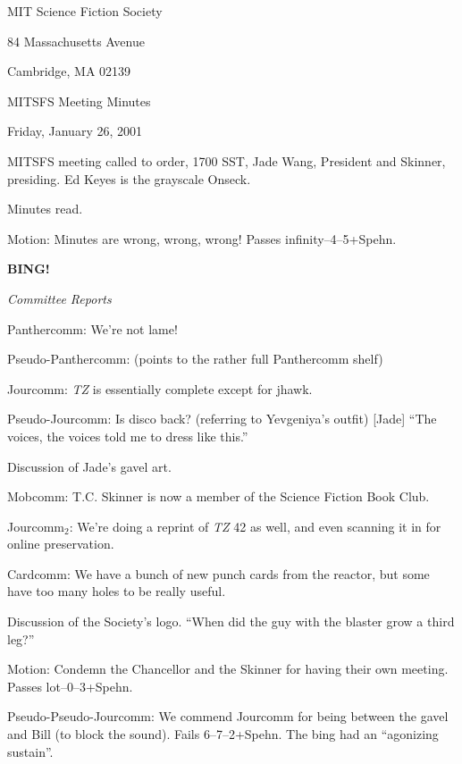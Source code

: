 \documentclass[12pt]{article}
\newcommand{\bing}{{\bf BING!} }
\newcommand{\goto}[1]{\bing \vskip 12pt \centerline{{\em{#1}}}}
\begin{document}
\begin{center}

MIT Science Fiction Society 

84 Massachusetts Avenue

Cambridge, MA 02139

\vspace{12pt}

MITSFS Meeting Minutes 

Friday, January 26, 2001

\end{center}
 
\vspace{18pt}

\setlength{\parskip}{6pt}

\noindent
MITSFS meeting called to order, 1700 SST, Jade Wang, President and
Skinner, presiding.  Ed Keyes is the grayscale Onseck.

Minutes read.

Motion: Minutes are wrong, wrong, wrong!  Passes infinity--4--5+Spehn.

\goto{Committee Reports}

Panthercomm: We're not lame!

Pseudo-Panthercomm: (points to the rather full Panthercomm shelf)

Jourcomm: {\em TZ} is essentially complete except for jhawk.

Pseudo-Jourcomm: Is disco back?  (referring to Yevgeniya's outfit)
[Jade] ``The voices, the voices told me to dress like this.''

Discussion of Jade's gavel art.

Mobcomm: T.C. Skinner is now a member of the Science Fiction Book Club.

Jourcomm$_2$: We're doing a reprint of {\em TZ} 42 as well, and even
scanning it in for online preservation.

Cardcomm: We have a bunch of new punch cards from the reactor, but
some have too many holes to be really useful.

Discussion of the Society's logo.  ``When did the guy with the blaster
grow a third leg?''

Motion: Condemn the Chancellor and the Skinner for having their own
meeting.  Passes lot--0--3+Spehn.

Pseudo-Pseudo-Jourcomm: We commend Jourcomm for being between the
gavel and Bill (to block the sound).  Fails 6--7--2+Spehn.  The bing
had an ``agonizing sustain''.
\end{document}
